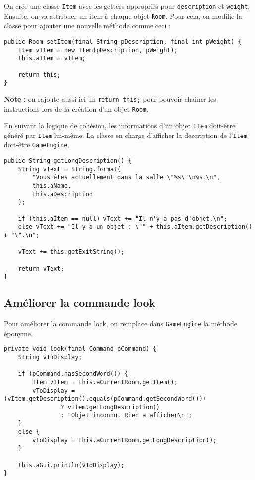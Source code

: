 \begin{exercise}[subtitle=Item]

On crée une classe \verb|Item| avec les getters appropriés pour \verb|description| et \verb|weight|. Ensuite, on va attribuer un item à chaque objet \verb|Room|. Pour cela, on modifie la classe pour ajouter une nouvelle méthode comme ceci :

\begin{verbatim}
public Room setItem(final String pDescription, final int pWeight) {
    Item vItem = new Item(pDescription, pWeight);
    this.aItem = vItem;
    
    return this;
}
\end{verbatim}

\textbf{Note :} on rajoute aussi ici un \texttt{return this;} pour pouvoir chainer les instructions lors de la création d'un objet \verb|Room|. 
\end{exercise}

\begin{exercise}[subtitle=Item description]

En suivant la logique de cohésion, les informations d'un objet \verb|Item| doit-être généré par \verb|Item| lui-même. La classe en charge d'afficher la description de l'\verb|Item| doit-être \verb|GameEngine|.

\begin{verbatim}
public String getLongDescription() {
    String vText = String.format(
        "Vous êtes actuellement dans la salle \"%s\"\n%s.\n",
        this.aName,
        this.aDescription
    );

    if (this.aItem == null) vText += "Il n'y a pas d'objet.\n";
    else vText += "Il y a un objet : \"" + this.aItem.getDescription() + "\".\n";

    vText += this.getExitString();

    return vText;
}
\end{verbatim}

\subsection*{Améliorer la commande look}

Pour améliorer la commande look, on remplace dans \verb|GameEngine| la méthode éponyme.

\begin{verbatim}
private void look(final Command pCommand) {
    String vToDisplay;

    if (pCommand.hasSecondWord()) {
        Item vItem = this.aCurrentRoom.getItem();
        vToDisplay = (vItem.getDescription().equals(pCommand.getSecondWord()))
                ? vItem.getLongDescription()
                : "Objet inconnu. Rien a afficher\n";
    }
    else {
        vToDisplay = this.aCurrentRoom.getLongDescription();
    }

    this.aGui.println(vToDisplay);
}
\end{verbatim}
\end{exercise}

